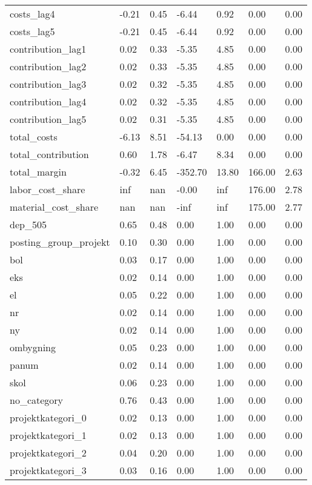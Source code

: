 \begin{landscape}
\begin{longtable}[h!]{lllllll}
costs_lag4 & -0.21 & 0.45 & -6.44 & 0.92 & 0.00 & 0.00 \\
costs_lag5 & -0.21 & 0.45 & -6.44 & 0.92 & 0.00 & 0.00 \\
contribution_lag1 & 0.02 & 0.33 & -5.35 & 4.85 & 0.00 & 0.00 \\
contribution_lag2 & 0.02 & 0.33 & -5.35 & 4.85 & 0.00 & 0.00 \\
contribution_lag3 & 0.02 & 0.32 & -5.35 & 4.85 & 0.00 & 0.00 \\
contribution_lag4 & 0.02 & 0.32 & -5.35 & 4.85 & 0.00 & 0.00 \\
contribution_lag5 & 0.02 & 0.31 & -5.35 & 4.85 & 0.00 & 0.00 \\
total_costs & -6.13 & 8.51 & -54.13 & 0.00 & 0.00 & 0.00 \\
total_contribution & 0.60 & 1.78 & -6.47 & 8.34 & 0.00 & 0.00 \\
total_margin & -0.32 & 6.45 & -352.70 & 13.80 & 166.00 & 2.63 \\
labor_cost_share & inf & nan & -0.00 & inf & 176.00 & 2.78 \\
material_cost_share & nan & nan & -inf & inf & 175.00 & 2.77 \\
dep_505 & 0.65 & 0.48 & 0.00 & 1.00 & 0.00 & 0.00 \\
posting_group_projekt & 0.10 & 0.30 & 0.00 & 1.00 & 0.00 & 0.00 \\
bol & 0.03 & 0.17 & 0.00 & 1.00 & 0.00 & 0.00 \\
eks & 0.02 & 0.14 & 0.00 & 1.00 & 0.00 & 0.00 \\
el & 0.05 & 0.22 & 0.00 & 1.00 & 0.00 & 0.00 \\
nr & 0.02 & 0.14 & 0.00 & 1.00 & 0.00 & 0.00 \\
ny & 0.02 & 0.14 & 0.00 & 1.00 & 0.00 & 0.00 \\
ombygning & 0.05 & 0.23 & 0.00 & 1.00 & 0.00 & 0.00 \\
panum & 0.02 & 0.14 & 0.00 & 1.00 & 0.00 & 0.00 \\
skol & 0.06 & 0.23 & 0.00 & 1.00 & 0.00 & 0.00 \\
no_category & 0.76 & 0.43 & 0.00 & 1.00 & 0.00 & 0.00 \\
projektkategori_0 & 0.02 & 0.13 & 0.00 & 1.00 & 0.00 & 0.00 \\
projektkategori_1 & 0.02 & 0.13 & 0.00 & 1.00 & 0.00 & 0.00 \\
projektkategori_2 & 0.04 & 0.20 & 0.00 & 1.00 & 0.00 & 0.00 \\
projektkategori_3 & 0.03 & 0.16 & 0.00 & 1.00 & 0.00 & 0.00 \\

\end{longtable}
\end{landscape}
